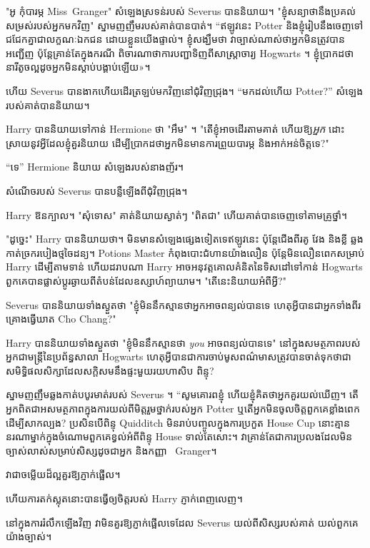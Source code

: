 {{"អូ កុំបារម្ភ Miss~Granger" សំឡេងស្រទន់របស់ Severus បាននិយាយ។ "ខ្ញុំសន្យាថានឹងប្រគល់សម្រស់របស់អ្នកមកវិញ" ស្នាមញញឹមរបស់គាត់បានបាត់។ “ឥឡូវ​នេះ Potter និង​ខ្ញុំ​រៀប​នឹង​ចេញ​ទៅ​ជជែក​គ្នា​ជា​លក្ខណៈ​ឯកជន ដោយ​ខ្លួន​យើង​ផ្ទាល់។ ខ្ញុំសង្ឃឹមថា វាច្បាស់ណាស់ថាអ្នកមិនត្រូវបានអញ្ជើញ ប៉ុន្តែគ្រាន់តែក្នុងករណី ពិចារណាថាការបញ្ជាទិញពីសាស្រ្តាចារ្យ Hogwarts ។ ខ្ញុំ​ប្រាកដ​ថា​នារី​តូច​ល្អ​ដូច​អ្នក​មិន​ស្តាប់​បង្គាប់​ឡើយ»។

ហើយ Severus បានងាកហើយដើរត្រឡប់មកវិញនៅជុំវិញជ្រុង។ “មកដល់ហើយ Potter?” សំឡេងរបស់គាត់បាននិយាយ។

Harry បាននិយាយទៅកាន់ Hermione ថា "អឹម" ។ "តើខ្ញុំអាចដើរតាមគាត់ ហើយឱ្យ\emph{អ្នក} ដោះស្រាយនូវអ្វីដែលខ្ញុំគួរនិយាយ ដើម្បីប្រាកដថាអ្នកមិនមានការព្រួយបារម្ភ និងអាក់អន់ចិត្តទេ?"

“ទេ” Hermione និយាយ សំឡេងរបស់នាងញ័រ។

សំណើចរបស់ Severus បានបន្លឺឡើងពីជុំវិញជ្រុង។

Harry ឱនក្បាល។ "សុំទោស" គាត់និយាយស្ងាត់ៗ "ពិតជា" ហើយគាត់បានចេញទៅតាមគ្រូថ្នាំ។

\later

"ដូច្នេះ" Harry បាននិយាយថា។ មិនមានសំឡេងផ្សេងទៀតទេឥឡូវនេះ ប៉ុន្តែជើងពីរគូ វែង និងខ្លី ឆ្លងកាត់ច្រករបៀងថ្មចៃដន្យ។ Potions Master កំពុងបោះជំហានយ៉ាងលឿន ប៉ុន្តែមិនលឿនពេកសម្រាប់ Harry ដើម្បីតាមទាន់ ហើយដរាបណា Harry អាចអនុវត្តគោលគំនិតនៃទិសដៅទៅកាន់ Hogwarts ពួកគេបានផ្លាស់ប្តូរឆ្ងាយពីតំបន់ដែលឧស្សាហ៍ព្យាយាម។ "តើនេះនិយាយអំពីអ្វី?"

Severus បាននិយាយទាំងស្ងួតថា "ខ្ញុំមិននឹកស្មានថាអ្នកអាចពន្យល់បានទេ ហេតុអ្វីបានជាអ្នកទាំងពីរគ្រោងធ្វើឃាត Cho Chang?"

Harry បាននិយាយទាំងស្ងួតថា "ខ្ញុំមិននឹកស្មានថា \emph{you} អាចពន្យល់បានទេ" នៅក្នុងសមត្ថភាពរបស់អ្នកជាមន្ត្រីនៃប្រព័ន្ធសាលា Hogwarts ហេតុអ្វីបានជាការចាប់មូសពណ៌មាសត្រូវបានចាត់ទុកថាជាសមិទ្ធិផលសិក្សាដែលសក្តិសមនឹងផ្ទះមួយរយហាសិប ពិន្ទុ?

ស្នាមញញឹមឆ្លងកាត់បបូរមាត់របស់ Severus ។ “សូមគោរពខ្ញុំ ហើយខ្ញុំគិតថាអ្នកគួរយល់ឃើញ។ តើ​អ្នក​ពិតជា​អសមត្ថភាព​ក្នុង​ការ​យល់​ពី​មិត្ត​រួម​ថ្នាក់​របស់​អ្នក Potter ឬ​តើ​អ្នក​មិន​ចូលចិត្ត​ពួកគេ​ខ្លាំងពេក​ដើម្បី​សាកល្បង? ប្រសិនបើពិន្ទុ Quidditch មិនរាប់បញ្ចូលក្នុងការប្រកួត House Cup នោះគ្មាននរណាម្នាក់ក្នុងចំណោមពួកគេខ្វល់អំពីពិន្ទុ House ទាល់តែសោះ។ វាគ្រាន់តែជាការប្រលងដែលមិនច្បាស់លាស់សម្រាប់សិស្សដូចជាអ្នក និងកញ្ញា ~Granger។

វាជាចម្លើយដ៏ល្អគួរឱ្យភ្ញាក់ផ្អើល។

ហើយ​ការ​តក់ស្លុត​នោះ​បាន​ធ្វើ​ឲ្យ​ចិត្ត​របស់ Harry ភ្ញាក់​ពេញ​លេញ។

នៅក្នុងការរំលឹកឡើងវិញ វាមិនគួរឱ្យភ្ញាក់ផ្អើលទេដែល Severus យល់ពីសិស្សរបស់គាត់ យល់ពួកគេយ៉ាងច្បាស់។

}}
